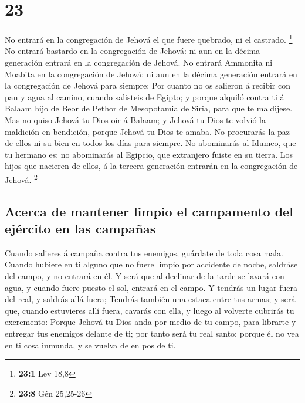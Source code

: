 \hypertarget{section-22}{%
\section{23}\label{section-22}}

 No entrará en la congregación de Jehová el que fuere
quebrado, ni el castrado. \footnote{\textbf{23:1} Lev 18,8}
 No entrará bastardo en la congregación de Jehová: ni aun
en la décima generación entrará en la congregación de Jehová.
 No entrará Ammonita ni Moabita en la congregación de
Jehová; ni aun en la décima generación entrará en la congregación de
Jehová para siempre:  Por cuanto no os salieron á recibir
con pan y agua al camino, cuando salisteis de Egipto; y porque alquiló
contra ti á Balaam hijo de Beor de Pethor de Mesopotamia de Siria, para
que te maldijese.  Mas no quiso Jehová tu Dios oir á
Balaam; y Jehová tu Dios te volvió la maldición en bendición, porque
Jehová tu Dios te amaba.  No procurarás la paz de ellos ni
su bien en todos los días para siempre.  No abominarás al
Idumeo, que tu hermano es: no abominarás al Egipcio, que extranjero
fuiste en su tierra.  Los hijos que nacieren de ellos, á
la tercera generación entrarán en la congregación de Jehová. \footnote{\textbf{23:8}
  Gén 25,25-26}

\hypertarget{acerca-de-mantener-limpio-el-campamento-del-ejuxe9rcito-en-las-campauxf1as}{%
\subsection{Acerca de mantener limpio el campamento del ejército en las
campañas}\label{acerca-de-mantener-limpio-el-campamento-del-ejuxe9rcito-en-las-campauxf1as}}

 Cuando salieres á campaña contra tus enemigos, guárdate
de toda cosa mala.  Cuando hubiere en ti alguno que no
fuere limpio por accidente de noche, saldráse del campo, y no entrará en
él.  Y será que al declinar de la tarde se lavará con
agua, y cuando fuere puesto el sol, entrará en el campo. 
Y tendrás un lugar fuera del real, y saldrás allá fuera; 
Tendrás también una estaca entre tus armas; y será que, cuando
estuvieres allí fuera, cavarás con ella, y luego al volverte cubrirás tu
excremento:  Porque Jehová tu Dios anda por medio de tu
campo, para librarte y entregar tus enemigos delante de ti; por tanto
será tu real santo: porque él no vea en ti cosa inmunda, y se vuelva de
en pos de ti.


